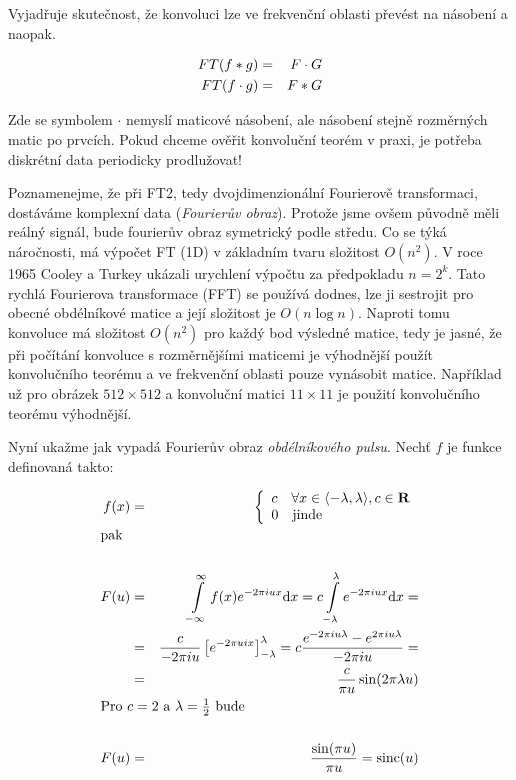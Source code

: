   Vyjadřuje skutečnost, že konvoluci lze ve frekvenční oblasti převést na násobení a naopak.

\begin{eqnarray}
FT(f\ast g)&=&F\cdot G\\
FT(f\cdot g)&=&F\ast G
\end{eqnarray}

Zde se symbolem $\cdot$ nemyslí maticové násobení, ale násobení stejně rozměrných matic po prvcích.
Pokud chceme ověřit konvoluční teorém v praxi, je potřeba diskrétní data periodicky prodlužovat!

Poznamenejme, že při FT2, tedy dvojdimenzionální Fourierově transformaci, dostáváme komplexní data ({\em Fourierův obraz}).
Protože jsme ovšem původně měli reálný signál, bude fourierův obraz symetrický podle středu. Co se týká náročnosti,
má výpočet FT (1D) v základním tvaru složitost $O(n^2)$. V roce 1965 Cooley a Turkey ukázali urychlení výpočtu za předpokladu
$n=2^k$. Tato rychlá Fourierova transformace (FFT) se používá dodnes, lze ji sestrojit pro obecné obdélníkové matice
a její složitost je $O(n\log n)$. Naproti tomu konvoluce má složitost $O(n^2)$ pro každý bod výsledné matice, 
tedy je jasné, že při počítání konvoluce s rozměrnějšími maticemi je výhodnější použít konvolučního teorému a ve frekvenční
oblasti pouze vynásobit matice. Například už pro obrázek $512\times512$ a konvoluční matici  $11\times11$ je použití
konvolučního teorému výhodnější.

Nyní ukažme jak vypadá Fourierův obraz {\em obdélníkového pulsu}. Nechť $f$ je funkce definovaná takto:

\begin{eqnarray}
f(x)&=&\left\{\begin{array}{ll}c\quad\forall x\in\langle-\lambda,\lambda\rangle,c\in \R\\
0\quad\hbox{jinde}\end{array}\right.\\
\noalign{\hbox{pak}\nonumber}\\
F(u)&=&\int\limits_{-\infty}^{\infty}f(x)e^{-2\pi iux}\d x=c\int\limits_{-\lambda}^\lambda e^{-2\pi i u x}\d x=\nonumber\\
&=&\frac{c}{-2\pi i u}\left[e^{-2\pi uix}\right]_{-\lambda}^\lambda=c\frac{e^{-2\pi iu\lambda}-e^{2\pi iu\lambda}}{-2\pi i u}=\nonumber\\
&=&\frac{c}{\pi u}\sin(2\pi\lambda u)\\
\noalign{\hbox{Pro $c=2$ a $\lambda=\frac{1}{2}$ bude\nonumber}}\\
F(u)&=&\frac{\sin(\pi u)}{\pi u}=\mathrm{sinc}(u)
\end{eqnarray}

